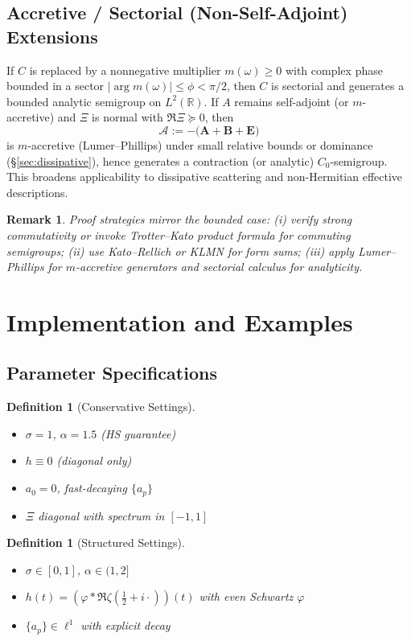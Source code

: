 \documentclass[10pt]{article}
\newtheorem{definition}[theorem]{Definition}
\newtheorem{remark}[theorem]{Remark}
\newcommand{\RR}{\mathbb{R}}
\begin{document}
\subsection{Accretive / Sectorial (Non-Self-Adjoint) Extensions}
If $C$ is replaced by a nonnegative multiplier $m(\omega)\ge 0$ with complex phase bounded in a sector 
$|\arg m(\omega)|\le \phi<\pi/2$, then $C$ is sectorial and generates a bounded analytic semigroup on $L^2(\RR)$.
If $A$ remains self-adjoint (or $m$-accretive) and $\Xi$ is normal with $\Re \Xi \succeq 0$, then
\[
\mathcal A := -\big(\mathbf A+\mathbf B+\mathbf E\big)
\]
is $m$-accretive (Lumer–Phillips) under small relative bounds or dominance (\S\ref{sec:dissipative}), hence generates a contraction (or analytic) $C_0$-semigroup.
This broadens applicability to dissipative scattering and non-Hermitian effective descriptions.

\begin{remark}
Proof strategies mirror the bounded case: (i) verify strong commutativity or invoke Trotter–Kato product formula for commuting semigroups; 
(ii) use Kato–Rellich or KLMN for form sums; 
(iii) apply Lumer–Phillips for $m$-accretive generators and sectorial calculus for analyticity.
\end{remark}

\section{Implementation and Examples}

\subsection{Parameter Specifications}

\begin{definition}[Conservative Settings]
\begin{itemize}
    \item $\sigma = 1$, $\alpha = 1.5$ (HS guarantee)
    \item $h \equiv 0$ (diagonal only)
    \item $a_0 = 0$, fast-decaying $\{a_p\}$
    \item $\Xi$ diagonal with spectrum in $[-1,1]$
\end{itemize}
\end{definition}

\begin{definition}[Structured Settings] 
\begin{itemize}
    \item $\sigma \in [0,1]$, $\alpha \in (1,2]$
    \item $h(t) = (\varphi * \Re\zeta(\frac12 + i\cdot))(t)$ with even Schwartz $\varphi$
    \item $\{a_p\} \in \ell^1$ with explicit decay
\end{itemize}
\end{definition}
\end{document}
